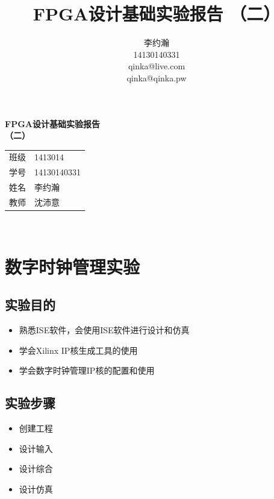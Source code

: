 \documentclass{ctexart}
\author{李约瀚 \\ 14130140331 \\ qinka@live.com \\ qinka@qinka.pw}
\title{FPGA设计基础实验报告 （二）}
\begin{document}
    
        \thispagestyle{empty}
        \begin{center}
            \vspace*{4em}
            {\Huge\textbf{FPGA设计基础实验报告\\\vspace*{0.5em} （二）}}
            \vfill
            \begin{tabular}{c@{：}l}
                班级 & 1413014 \\
                学号 & 14130140331 \\ 
                姓名 & 李约瀚 \\ 
                教师 & 沈沛意 \\
            \end{tabular} 
            \vspace*{4em}\\
        \end{center}
        \newpage
        
       
        \setcounter{page}{0}
        \setcounter{section}{0}

        
        \section{数字时钟管理实验}
        
        \subsection{实验目的}
        \begin{itemize}
        \item 熟悉ISE软件，会使用ISE软件进行设计和仿真
        \item 学会Xilinx IP核生成工具的使用
        \item 学会数字时钟管理IP核的配置和使用
        \end{itemize}

        \subsection{实验步骤}

        \begin{itemize}
        \item 创建工程
        \item 设计输入
        \item 设计综合
        \item 设计仿真
        \end{itemize}
\end{document}
